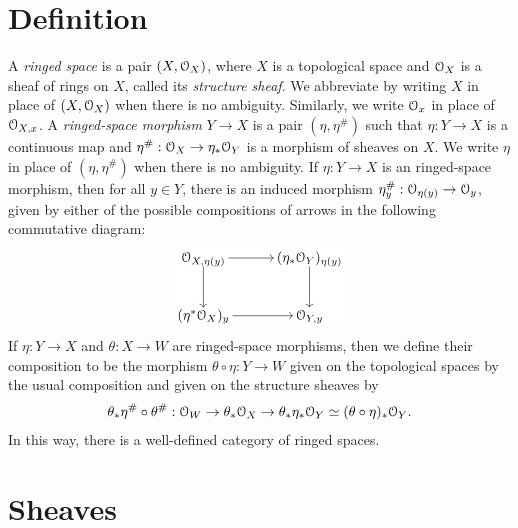 \documentclass[10pt,final,oneside]{amsbook}
\numberwithin{equation}{section}
\begin{document}
\section{Definition}

A \emph{ringed space} is a pair $(X, \cal{O}_X)$, where $X$ is a topological space and $\cal{O}_X$ is a sheaf of rings on $X$, called its \emph{structure sheaf}.
We abbreviate by writing $X$ in place of $(X, \cal{O}_X)$ when there is no ambiguity.
Similarly, we write $\cal{O}_x$ in place of $\cal{O}_{X, x}$.
A \emph{ringed-space morphism} $Y \to X$ is a pair $(\eta, \eta^\#)$ such that $\eta : Y \to X$ is a continuous map and $\eta^\# : \cal{O}_X \to \eta_\ast \cal{O}_Y$ is a morphism of sheaves on $X$.
We write $\eta$ in place of $(\eta, \eta^\#)$ when there is no ambiguity.
If $\eta : Y \to X$ is an ringed-space morphism, then for all $y \in  Y$, there is an induced morphism $\eta_y^\# : \cal{O}_{\eta(y)} \to \cal{O}_{y}$, given by either of the possible compositions of arrows in the following commutative diagram:
\begin{equation}
\begin{tikzpicture}[baseline=(current  bounding  box.center)]
\tikzstyle{every node}=[fill=white,  inner sep=2pt]
\matrix (m)
[	matrix of math nodes,
	row sep 		=	3em,
	column sep 	=	3em,
	text height	=	1.5ex,
	text depth	=	0.25ex
]
{ 		\cal{O}_{X, \eta(y)}		&(\eta_\ast \cal{O}_Y)_{\eta(y)}	\\
		(\eta^\ast\cal{O}_X)_y	&\cal{O}_{Y, y}\\
};
\path[->, font=\small]
(m-1-1) edge 	(m-1-2)
(m-1-1) edge 	(m-2-1)
(m-1-2) edge 	(m-2-2)
(m-2-1) edge 	(m-2-2);
\end{tikzpicture}
\end{equation}
If $\eta : Y \to X$ and $\theta : X \to W$ are ringed-space morphisms, then we define their composition to be the morphism $\theta \circ \eta : Y \to W$ given on the topological spaces by the usual composition and given on the structure sheaves by
\begin{align}
\theta_\ast\eta^\# \circ \theta^\# : \cal{O}_W \to \theta_\ast \cal{O}_X \to \theta_\ast \eta_\ast \cal{O}_Y \simeq (\theta \circ \eta)_\ast \cal{O}_Y.
\end{align}
In this way, there is a well-defined category of ringed spaces.

\section{Sheaves}
\end{document}
